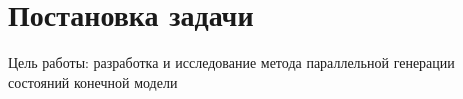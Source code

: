 \chapter{Постановка задачи}
\label{cha:goals}

Цель работы: разработка и исследование метода параллельной генерации состояний конечной модели

